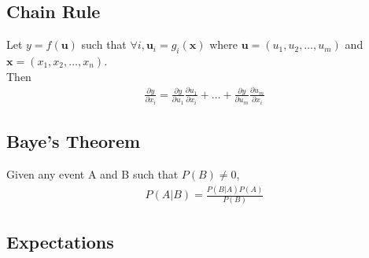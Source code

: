 \documentclass[a4paper,12pt]{article}
\theoremstyle{definition}
\begin{document}
\subsection*{Chain Rule}
Let $y = f(\mathbf{u})$ such that $\forall i, \mathbf{u}_i = g_i(\mathbf{x})$ where $\mathbf{u} = (u_1, u_2, \ldots, u_m)$ and $\mathbf{x} = (x_1, x_2, \ldots, x_n)$. \\
Then
\begin{equation}
    \begin{aligned}
        \frac{\partial y}{\partial x_i} = \frac{\partial y}{\partial u_1}\frac{\partial u_1}{\partial x_i} + \ldots + \frac{\partial y}{\partial u_m}\frac{\partial u_m}{\partial x_i}
    \end{aligned}
\end{equation}

\subsection*{Baye's Theorem}
Given any event A and B such that $P(B) \neq 0$,
\begin{equation}
    \begin{aligned}
        P(A|B) = \frac{P(B|A)P(A)}{P(B)}
    \end{aligned}
\end{equation}

\subsection*{Expectations}
\end{document}
